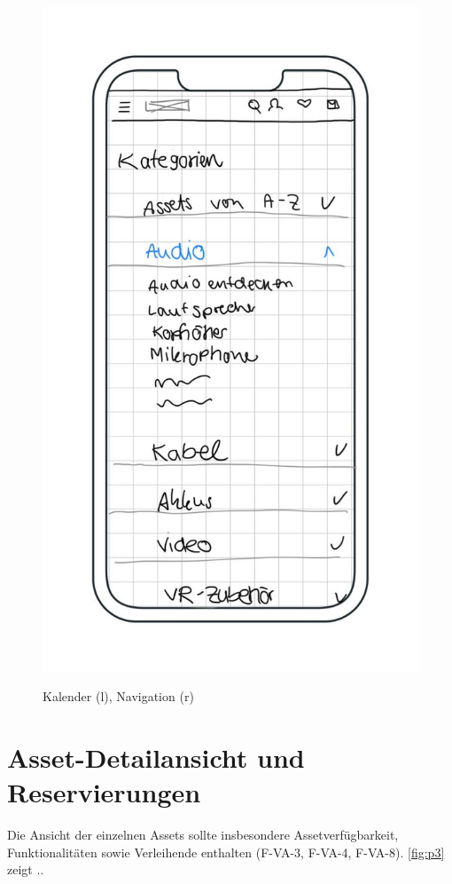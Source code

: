 \begin{figure}[h]
    \includegraphics[scale=0.37]{Bilder/Mockups/Kategorien.jpg}
    \label{fig:kalender}
\caption[Kalenderkomponente]{Kalender (l), Navigation (r)}
\end{figure}



\section{Asset-Detailansicht und Reservierungen}
Die Ansicht der einzelnen Assets sollte insbesondere Assetverfügbarkeit, Funktionalitäten sowie
Verleihende enthalten (F-VA-3, F-VA-4, F-VA-8). \ref{fig:p3} zeigt ..

